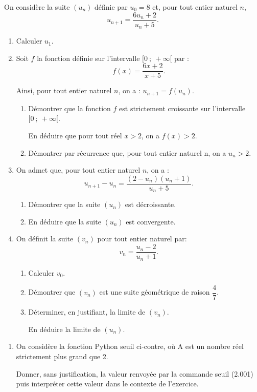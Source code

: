 \medskip

On considère la suite $\left(u_n\right)$ définie par $u_0 = 8$ et, pour tout entier naturel $n$,
\[u_{n +1} = \dfrac{6u_n + 2}{u_n +5}.\]

\smallskip

\begin{enumerate}
\item Calculer $u_1$.
\item Soit $f$ la fonction définie sur l'intervalle $[0~;~+\infty[$ par :
\[f(x) = \dfrac{6x + 2 }{x +5}.\]

Ainsi, pour tout entier naturel $n$, on a : $u_{n+1} = f\left(u_n\right)$.
	\begin{enumerate}
		\item Démontrer que la fonction $f$ est strictement croissante sur l'intervalle $[0~;~+\infty[$.
		
En déduire que pour tout réel $x > 2$, on a $f(x) > 2$.
		\item Démontrer par récurrence que, pour tout entier naturel n, on a $u_n > 2$.
	\end{enumerate}
\item On admet que, pour tout entier naturel $n$, on a :
\[u_{n+1} - u_n = \dfrac{\left(2 - u_n\right)\left(u_n + 1\right)}{u_n +5}.\]

	\begin{enumerate}
		\item Démontrer que la suite $\left(u_n\right)$ est décroissante.
		\item En déduire que la suite $\left(u_n\right)$ est convergente.
	\end{enumerate}
\item On définit la suite $\left(v_n\right)$ pour tout entier naturel par:
\[v_n = \dfrac{u_n - 2}{u_n + 1}.\]

	\begin{enumerate}
		\item Calculer $v_0$.
		\item Démontrer que $\left(v_n\right)$ est une suite géométrique de raison $\dfrac47$.
		\item Déterminer, en justifiant, la limite de $\left(v_n\right)$.
		
En déduire la limite de $\left(u_n\right)$.
	\end{enumerate}
\end{enumerate}
\begin{minipage}{0.53\linewidth}
\begin{enumerate}[resume]
		\item  On considère la fonction
Python seuil ci-contre, où A est un nombre réel strictement plus grand que 2.

Donner, sans justification, la valeur renvoyée par la commande seuil (2.001) puis interpréter cette valeur dans le contexte de l'exercice.
\end{enumerate}
\end{minipage}\hfill
